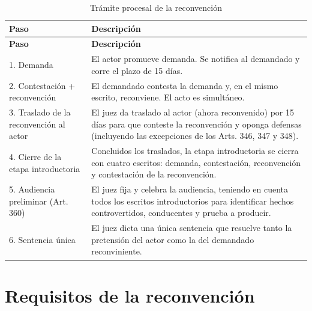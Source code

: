 \documentclass[12pt,oneside]{book}
\begin{document}
\begin{longtable}{p{} p{}}
\caption{Trámite procesal de la reconvención} \\
\toprule
\textbf{Paso} & \textbf{Descripción} \\
\midrule
\endfirsthead
\toprule
\textbf{Paso} & \textbf{Descripción} \\
\midrule
\endhead
1. Demanda & El actor promueve demanda. Se notifica al demandado y corre el plazo de 15 días. \\
2. Contestación + reconvención & El demandado contesta la demanda y, en el mismo escrito, reconviene. El acto es simultáneo. \\
3. Traslado de la reconvención al actor & El juez da traslado al actor (ahora reconvenido) por 15 días para que conteste la reconvención y oponga defensas (incluyendo las excepciones de los Arts. 346, 347 y 348). \\
4. Cierre de la etapa introductoria & Concluidos los traslados, la etapa introductoria se cierra con cuatro escritos: demanda, contestación, reconvención y contestación de la reconvención. \\
5. Audiencia preliminar (Art. 360) & El juez fija y celebra la audiencia, teniendo en cuenta todos los escritos introductorios para identificar hechos controvertidos, conducentes y prueba a producir. \\
6. Sentencia única & El juez dicta una única sentencia que resuelve tanto la pretensión del actor como la del demandado reconviniente. \\
\bottomrule
\end{longtable}

\section{Requisitos de la reconvención}
\end{document}
